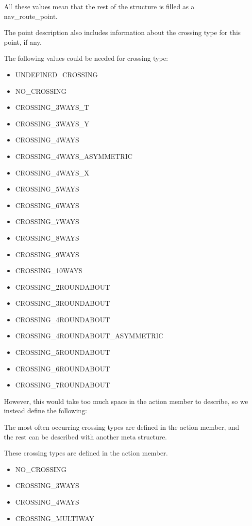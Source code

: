 \documentclass[a4paper]{article}
\begin{document}
All these values mean that the rest of the structure
is filled as a nav\_route\_point.

The point description also includes information about the
crossing type for this point, if any.

The following values could be needed for crossing type:

\begin{itemize}

\item UNDEFINED\_CROSSING
\item NO\_CROSSING
\item CROSSING\_3WAYS\_T
\item CROSSING\_3WAYS\_Y
\item CROSSING\_4WAYS
\item CROSSING\_4WAYS\_ASYMMETRIC
\item CROSSING\_4WAYS\_X
\item CROSSING\_5WAYS
\item CROSSING\_6WAYS
\item CROSSING\_7WAYS
\item CROSSING\_8WAYS
\item CROSSING\_9WAYS
\item CROSSING\_10WAYS
\item CROSSING\_2ROUNDABOUT
\item CROSSING\_3ROUNDABOUT
\item CROSSING\_4ROUNDABOUT
\item CROSSING\_4ROUNDABOUT\_ASYMMETRIC
\item CROSSING\_5ROUNDABOUT
\item CROSSING\_6ROUNDABOUT
\item CROSSING\_7ROUNDABOUT

\end{itemize}

However, this would take too much space in the action member
to describe, so we instead define the following:

The most often occurring crossing types are defined in the
action member, and the rest can be described with another meta
structure.

These crossing types are defined in the action member.

\begin{itemize}
\item NO\_CROSSING
\item CROSSING\_3WAYS
\item CROSSING\_4WAYS
\item CROSSING\_MULTIWAY
\end{itemize}
\end{document}

